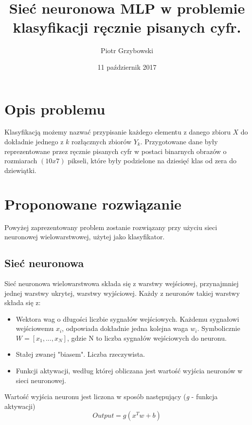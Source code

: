 \documentclass{article}
\title{Sieć neuronowa MLP w problemie klasyfikacji ręcznie pisanych cyfr.}
\date{11 październik 2017}
\author{Piotr Grzybowski}
\begin{document}
 
\maketitle
\newpage

\section{Opis problemu}
	Klasyfikacją możemy nazwać przypisanie każdego elementu z danego zbioru $X$ do dokładnie jednego z $k$ rozłącznych zbiorów $Y_k$. Przygotowane dane były reprezentowane przez ręcznie pisanych cyfr w postaci binarnych obrazów o rozmiarach $(10x7)$ pikseli, które były podzielone na dziesięć klas od zera do dziewiątki.
    
    
\section{Proponowane rozwiązanie}
	Powyżej zaprezentowany problem zostanie rozwiązany przy użyciu sieci neuronowej wielowarstwowej, użytej jako klasyfikator. 
	\subsection{Sieć neuronowa}
	Sieć neuronowa wielowarstwowa składa się z warstwy wejściowej, przynajmniej jednej warstwy ukrytej, warstwy wyjściowej. Każdy z neuronów takiej warstwy składa się z:
	\begin{itemize}
		\item Wektora wag o długości liczbie sygnałów wejściowych. Każdemu sygnałowi wejściowemu $x_i$, odpowiada dokładnie jedna kolejna waga $w_i$. Symbolicznie $W = [x_1, ..., x_N]$, gdzie N to liczba sygnałów wejściowych do neuronu.
		\item Stałej zwanej "biasem". Liczba rzeczywista.
		\item Funkcji aktywacji, według której obliczana jest wartość wyjścia neuronów w sieci neuronowej.
	\end{itemize}
    Wartość wyjścia neuronu jest liczona w sposób następujący (\textit{g} - funkcja aktywacji)
    \begin{equation}
    		Output = g(x^Tw + b)
    \end{equation}
    
\end{document}
